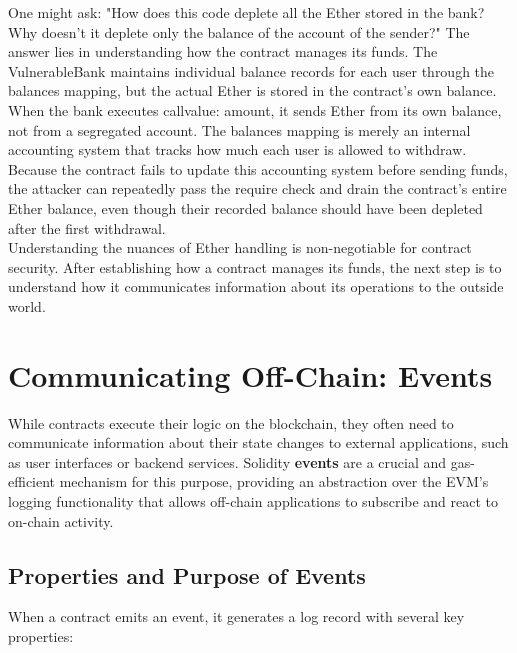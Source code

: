 \documentclass{scrbook}
\begin{document}
One might ask: "How does this code deplete all the Ether stored in the bank? Why doesn't it deplete only the balance of the account of the sender?" The answer lies in understanding how the contract manages its funds. The VulnerableBank maintains individual balance records for each user through the balances mapping, but the actual Ether is stored in the contract's own balance. When the bank executes call{value: amount}, it sends Ether from its own balance, not from a segregated account. The balances mapping is merely an internal accounting system that tracks how much each user is allowed to withdraw. Because the contract fails to update this accounting system before sending funds, the attacker can repeatedly pass the require check and drain the contract's entire Ether balance, even though their recorded balance should have been depleted after the first withdrawal. \\

Understanding the nuances of Ether handling is non-negotiable for contract security. After establishing how a contract manages its funds, the next step is to understand how it communicates information about its operations to the outside world.

\chapter{Communicating Off-Chain: Events}

While contracts execute their logic on the blockchain, they often need to communicate information about their state changes to external applications, such as user interfaces or backend services. Solidity \textbf{events} are a crucial and gas-efficient mechanism for this purpose, providing an abstraction over the EVM's logging functionality that allows off-chain applications to subscribe and react to on-chain activity.

\section{Properties and Purpose of Events}

When a contract emits an event, it generates a log record with several key properties:
\end{document}
